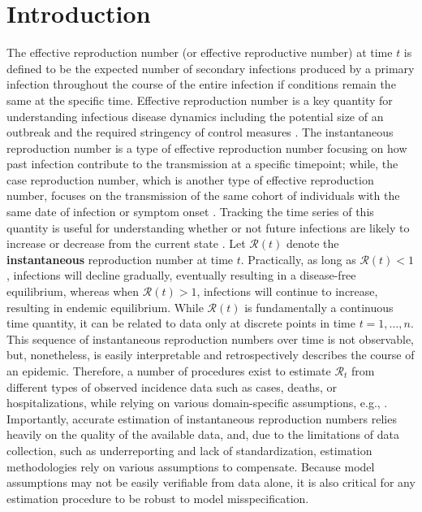 \documentclass[10pt,letterpaper]{article}
\def\calR{\mathcal{R}}
\begin{document}
\linenumbers

\section{Introduction}
\label{sec:intro}

The effective reproduction number (or effective reproductive number) at time
$\textit{t}$ is defined to be the expected number of secondary infections produced 
by a primary infection throughout the course of the entire infection if conditions 
remain the same at the specific time. Effective reproduction number is a key quantity 
for understanding infectious disease dynamics including the potential size of an
outbreak and the required stringency of control measures \cite{nishiura2009effective,fraser2007estimating}. 
The instantaneous reproduction number is a type of effective reproduction number focusing on how past 
infection contribute to the transmission at a specific timepoint; while, the case 
reproduction number, which is another type of effective reproduction number,
focuses on the transmission of the same cohort of individuals with the same date 
of infection or symptom onset \cite{gostic2020practical}. Tracking the time
series of this quantity is useful for understanding whether or not
future infections are likely to increase or decrease from the current state \cite{anderson1991infectious}. Let
$\calR(t)$ denote the \textbf{instantaneous} reproduction number at time $t$. Practically, as
long as $\calR(t) < 1$, infections will decline gradually, eventually resulting
in a disease-free equilibrium, whereas when $\calR(t) > 1$, infections will
continue to increase, resulting in endemic equilibrium. While $\calR(t)$ is
fundamentally a continuous time quantity, it can be related to data only at
discrete points in time $t = 1,\ldots,n$. This sequence of instantaneous
reproduction numbers over time is not observable, but, nonetheless, is easily
interpretable and retrospectively describes the course of an epidemic.
Therefore, a number of procedures exist to estimate $\calR_t$ from different
types of observed incidence data such as cases, deaths, or hospitalizations,
while relying on various domain-specific assumptions, e.g., 
\cite{wallinga2004different,hao2020reconstruction,goldstein2023semiparametric,goldstein2024incorporating}. 
Importantly, accurate
estimation of instantaneous reproduction numbers relies heavily on the quality of
the available data, and, due to the limitations of data collection, such as
underreporting and lack of standardization, estimation methodologies rely on
various assumptions to compensate. Because model assumptions may not be easily
verifiable from data alone, it is also critical for any estimation procedure to
be robust to model misspecification. 
\end{document}
